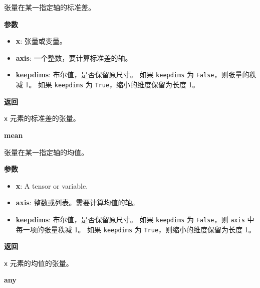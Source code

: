 张量在某一指定轴的标准差。

\textbf{参数}

\begin{itemize}
\tightlist
\item
  \textbf{x}: 张量或变量。
\item
  \textbf{axis}: 一个整数，要计算标准差的轴。
\item
  \textbf{keepdims}: 布尔值，是否保留原尺寸。 如果 \texttt{keepdims} 为
  \texttt{False}，则张量的秩减 1。 如果 \texttt{keepdims} 为
  \texttt{True}，缩小的维度保留为长度 1。
\end{itemize}

\textbf{返回}

\texttt{x} 元素的标准差的张量。


\textbf{mean}\label{mean}

\begin{Shaded}
\begin{Highlighting}[]
\OperatorTok{=}\OperatorTok{=}\NormalTok{)}
\end{Highlighting}
\end{Shaded}

张量在某一指定轴的均值。

\textbf{参数}

\begin{itemize}
\tightlist
\item
  \textbf{x}: A tensor or variable.
\item
  \textbf{axis}: 整数或列表。需要计算均值的轴。
\item
  \textbf{keepdims}: 布尔值，是否保留原尺寸。 如果 \texttt{keepdims} 为
  \texttt{False}，则 \texttt{axis} 中每一项的张量秩减 1。 如果
  \texttt{keepdims} 为 \texttt{True}，则缩小的维度保留为长度 1。
\end{itemize}

\textbf{返回}

\texttt{x} 元素的均值的张量。


\textbf{any}\label{any}

\begin{Shaded}
\begin{Highlighting}[]
\OperatorTok{=}\OperatorTok{=}\NormalTok{)}
\end{Highlighting}
\end{Shaded}

